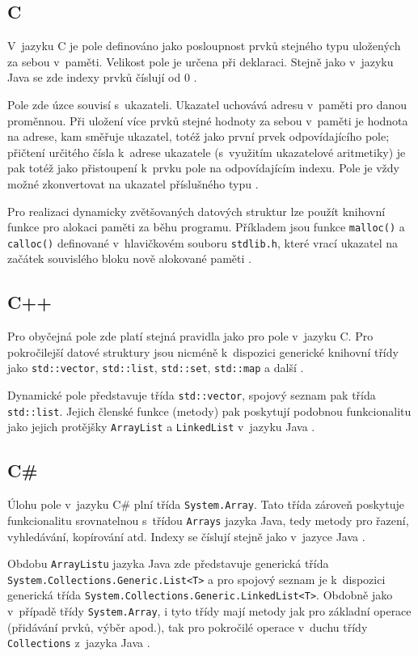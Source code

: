 \documentclass[onepage, a4paper, 12pt]{bakalarka}
\begin{document}
\subsection{C}
V~jazyku C je pole definováno jako posloupnost prvků stejného typu uložených za sebou v~paměti. Velikost pole je určena při deklaraci. Stejně jako v~jazyku Java se zde indexy prvků číslují od 0 \cite{cpp-guide-array}.\par
Pole zde úzce souvisí s~ukazateli. Ukazatel uchovává adresu v~paměti pro danou proměnnou. Při uložení více prvků stejné hodnoty za sebou v~paměti je hodnota na adrese, kam směřuje ukazatel, totéž jako první prvek odpovídajícího pole; přičtení určitého čísla k~adrese ukazatele (s~využitím ukazatelové aritmetiky) je pak totéž jako přistoupení k~prvku pole na odpovídajícím indexu. Pole je vždy možné zkonvertovat na ukazatel příslušného typu \cite{cpp-guide-pointer}.\par
Pro realizaci dynamicky zvětšovaných datových struktur lze použít knihovní funkce pro alokaci paměti za běhu programu. Příkladem jsou funkce \texttt{malloc()} a \texttt{calloc()} definované v~hlavičkovém souboru \texttt{stdlib.h}, které vrací ukazatel na začátek souvislého bloku nově alokované paměti \cite{cpp-guide-malloc, cpp-guide-calloc}.

\subsection{C++}
Pro obyčejná pole zde platí stejná pravidla jako pro pole v~jazyku C. Pro pokročilejší datové struktury jsou nicméně k~dispozici generické knihovní třídy jako \texttt{std::vector}, \texttt{std::list}, \texttt{std::set}, \texttt{std::map} a další \cite{cpp-guide-vector, cpp-guide-list, cpp-guide-set, cpp-guide-map}.\par
Dynamické pole představuje třída \texttt{std::vector}, spojový seznam pak třída \texttt{std::list}. Jejich členské funkce (metody) pak poskytují podobnou funkcionalitu jako jejich protějšky \texttt{ArrayList} a \texttt{LinkedList} v~jazyku Java \cite{cpp-guide-vector, cpp-guide-list}.

\subsection{C\#}
Úlohu pole v~jazyku C\# plní třída \texttt{System.Array}. Tato třída zároveň poskytuje funkcionalitu srovnatelnou s~třídou \texttt{Arrays} jazyka Java, tedy metody pro řazení, vyhledávání, kopírování atd. Indexy se číslují stejně jako v~jazyce Java \cite{cs-guide-array-tutorial, cs-guide-array}.\par
Obdobu \texttt{ArrayListu} jazyka Java zde představuje generická třída \texttt{System.Collections.Generic.List<T>} a pro spojový seznam je k~dispozici generická třída \texttt{System.Collections.Generic.LinkedList<T>}. Obdobně jako v~případě třídy \texttt{System.Array}, i tyto třídy mají metody jak pro základní operace (přidávání prvků, výběr apod.), tak pro pokročilé operace v~duchu třídy \texttt{Collections} z~jazyka Java \cite{cs-guide-list, cs-guide-linkedlist}.
\end{document}
